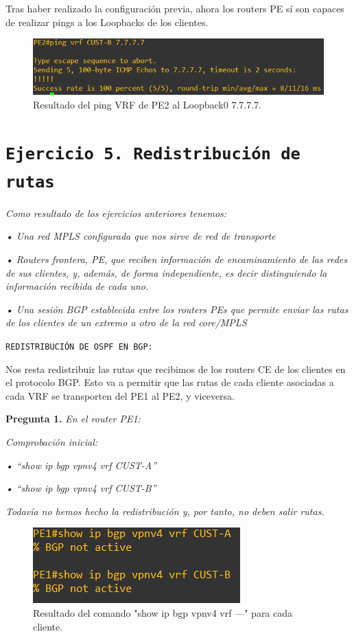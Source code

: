 \documentclass[a4paper, 12pt]{report}
\begin{document}
Tras haber realizado la configuración previa, ahora los routers PE sí son capaces de realizar pings a los Loopbacks de los clientes.

\begin{figure}[H]
	\centering
	\includegraphics[scale=0.7]{pingloopbackexito.png}
	\caption{Resultado del ping VRF de PE2 al Loopback0 7.7.7.7.}
	\label{fig:pingloopbackexito}
\end{figure}
\newpage
\section{\texttt{Ejercicio 5. Redistribución de rutas}}
\textit{Como resultado de los ejercicios anteriores tenemos:}

\textit{• Una red MPLS configurada que nos sirve de red de transporte}

\textit{• Routers frontera, PE, que reciben información de encaminamiento de las redes de sus clientes,
y, además, de forma independiente, es decir distinguiendo la información recibida de cada uno.}

\textit{• Una sesión BGP establecida entre los routers PEs que permite enviar las rutas de los clientes
de un extremo a otro de la red core/MPLS}

\texttt{REDISTRIBUCIÓN DE OSPF EN BGP:}

Nos resta redistribuir las rutas que recibimos de los routers CE de los clientes en el protocolo
BGP. Esto va a permitir que las rutas de cada cliente asociadas a cada VRF se transporten del
PE1 al PE2, y viceversa.

\textbf{Pregunta 1.}
\textit{En el router PE1:}

\textit{Comprobación inicial:}

\textit{• “show ip bgp vpnv4 vrf CUST-A”}

\textit{• “show ip bgp vpnv4 vrf CUST-B”}

\textit{Todavía no hemos hecho la redistribución y, por tanto, no deben salir rutas.}

\begin{figure}[H]
	\centering
	\includegraphics[scale=1]{showipbgp.png}
	\caption{Resultado del comando "show ip bgp vpnv4 vrf ---" para cada cliente.}
	\label{fig:showipbgpCUSTA}
\end{figure}
\end{document}
